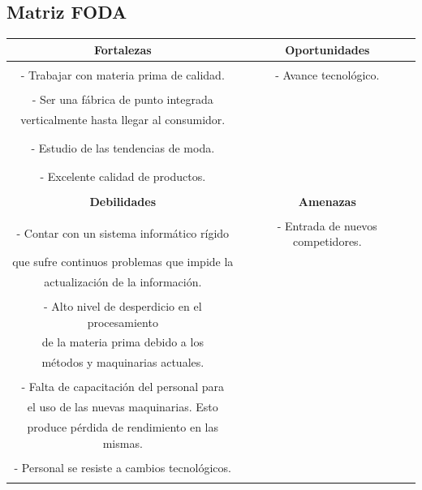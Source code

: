 \documentclass[a4paper,12pt,titlepage]{article}
\begin{document}
	\subsection{Matriz FODA}
	\vspace*{0.5cm}
	\begin{tabular}{|c|c|}
	\hline 
	\textbf{Fortalezas} & \textbf{Oportunidades} \\ \hline & \\
- Trabajar con materia prima de calidad. & - Avance tecnol\'{o}gico.\\ &\\
- Ser una f\'{a}brica de punto integrada & \\verticalmente hasta llegar al consumidor. &\\ &\\ & \\
- Estudio de las tendencias de moda. & \\& \\ & \\
- Excelente calidad de productos.& \\& \\

	\hline
	\textbf{Debilidades} & \textbf{Amenazas} \\
	\hline &\\
- Contar con un sistema inform\'{a}tico r\'{i}gido& - Entrada de nuevos competidores. \\que sufre continuos problemas que impide la &\\ actualizaci\'{o}n de la informaci\'{o}n. &\\ &\\
- Alto nivel de desperdicio en el procesamiento &\\ de la materia prima debido a los &\\ m\'{e}todos y maquinarias actuales. &\\ &\\
- Falta de capacitaci\'{o}n del personal para &\\el uso de las nuevas maquinarias. Esto &\\ produce p\'{e}rdida de rendimiento en las mismas. &\\ &\\
- Personal se resiste a cambios tecnol\'{o}gicos. &\\ &\\
	\hline    
	\end{tabular}


\newpage
\end{document}
